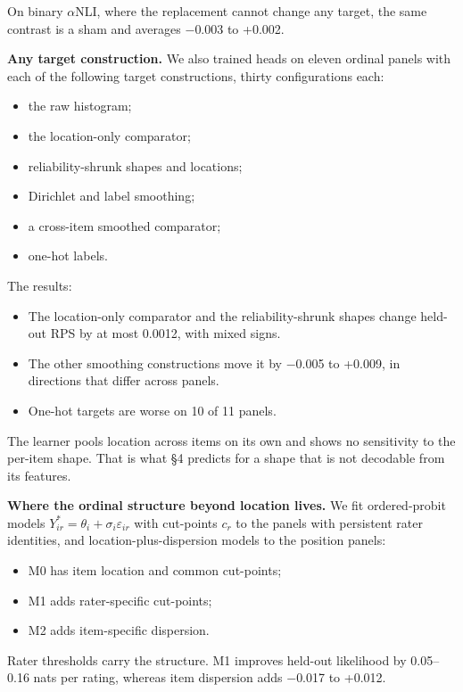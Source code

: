\documentclass{article}
\providecommand{\tightlist}{\setlength{\itemsep}{0pt}\setlength{\parskip}{0pt}}
\begin{document}
On binary $\alpha$NLI, where the replacement cannot change any target, the same contrast is a sham and averages $-$0.003 to +0.002.

\textbf{Any target construction.} We also trained heads on eleven ordinal panels with each of the following target constructions, thirty configurations each:

\begin{itemize}
\tightlist
\item
  the raw histogram;
\item
  the location-only comparator;
\item
  reliability-shrunk shapes and locations;
\item
  Dirichlet and label smoothing;
\item
  a cross-item smoothed comparator;
\item
  one-hot labels.
\end{itemize}

The results:

\begin{itemize}
\tightlist
\item
  The location-only comparator and the reliability-shrunk shapes change held-out RPS by at most 0.0012, with mixed signs.
\item
  The other smoothing constructions move it by $-$0.005 to +0.009, in directions that differ across panels.
\item
  One-hot targets are worse on 10 of 11 panels.
\end{itemize}

The learner pools location across items on its own and shows no sensitivity to the per-item shape. That is what \S{}4 predicts for a shape that is not decodable from its features.

\textbf{Where the ordinal structure beyond location lives.} We fit ordered-probit models \(Y^*_{ir} = \theta_i + \sigma_i\varepsilon_{ir}\) with cut-points \(c_r\) to the panels with persistent rater identities, and location-plus-dispersion models to the position panels:

\begin{itemize}
\tightlist
\item
  M0 has item location and common cut-points;
\item
  M1 adds rater-specific cut-points;
\item
  M2 adds item-specific dispersion.
\end{itemize}

Rater thresholds carry the structure. M1 improves held-out likelihood by 0.05--0.16 nats per rating, whereas item dispersion adds $-$0.017 to +0.012.
\end{document}
